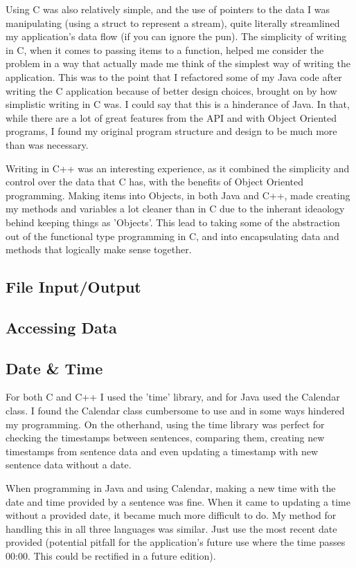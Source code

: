 \documentclass{article}
\begin{document}
Using C was also relatively simple, and the use of pointers to the data I was manipulating (using a struct to represent a stream), quite literally streamlined my application's data flow (if you can ignore the pun). The simplicity of writing in C, when it comes to passing items to a function, helped me consider the problem in a way that actually made me think of the simplest way of writing the application. This was to the point that I refactored some of my Java code after writing the C application because of better design choices, brought on by how simplistic writing in C was. I could say that this is a hinderance of Java. In that, while there are a lot of great features from the API and with Object Oriented programs, I found my original program structure and design to be much more than was necessary.

Writing in C++ was an interesting experience, as it combined the simplicity and control over the data that C has, with the benefits of Object Oriented programming. Making items into Objects, in both Java and C++, made creating my methods and variables a lot cleaner than in C due to the inherant ideaology behind keeping things as 'Objects'. This lead to taking some of the abstraction out of the functional type programming in C, and into encapsulating data and methods that logically make sense together.

\subsection{File Input/Output}

\subsection{Accessing Data}

\subsection{Date \& Time}

For both C and C++ I used the 'time' library\cite{time}, and for Java used the Calendar class. I found the Calendar class cumbersome to use and in some ways hindered my programming. On the otherhand, using the time library was perfect for checking the timestamps between sentences, comparing them, creating new timestamps from sentence data and even updating a timestamp with new sentence data without a date. 

When programming in Java and using Calendar, making a new time with the date and time provided by a sentence was fine. When it came to updating a time without a provided date, it became much more difficult to do. My method for handling this in all three languages was similar. Just use the most recent date provided (potential pitfall for the application's future use where the time passes 00:00. This could be rectified in a future edition). 
\end{document}
